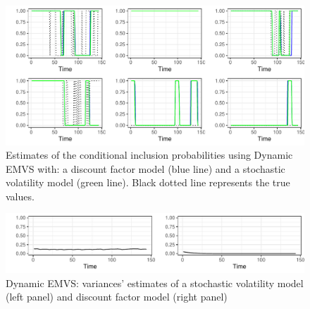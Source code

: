 \documentclass[
  12pt,
]{book}
\theoremstyle{break}
\theoremstyle{nonumberplain}
\begin{document}
\begin{figure}[H]

{\centering \includegraphics{Dynamic-Shrinkage-in-Bayesian-Structural-Time-Series-and-Vector-Autoregressive-Models_files/figure-latex/myfig13-1} 

}

\caption{Estimates of the conditional inclusion probabilities using Dynamic EMVS with: a discount factor model (blue line) and  a stochastic volatility model (green line). Black dotted line represents the true values.}\label{fig:myfig13}
\end{figure}

\begin{figure}[H]

{\centering \includegraphics{Dynamic-Shrinkage-in-Bayesian-Structural-Time-Series-and-Vector-Autoregressive-Models_files/figure-latex/myfig11-1} 

}

\caption{Dynamic EMVS: variances' estimates of a stochastic volatility model (left panel) and discount factor model (right panel)}\label{fig:myfig11}
\end{figure}
\end{document}
